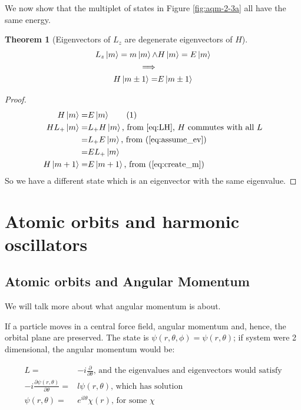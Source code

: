 \documentclass[]{article}
\newcommand\numberthis{\addtocounter{equation}{1}\tag{\theequation}}
\newtheorem{thm}{Theorem}
\begin{document}
 We now show that the multiplet of states in Figure \ref{fig:aqm-2-3a} all have the same energy. 

\begin{thm}[Eigenvectors of $L_z$ are degenerate eigenvectors of $H$]
	\begin{align*}
	L_z \ket{m} = m \ket{m} \land& H \ket{m} = E \ket{m}\\
	 \implies&\\
	  H \ket{m \pm 1} =& E \ket{m \pm 1}
	\end{align*}
\end{thm} 
\begin{proof}
	\begin{align*}
	H \ket{m} =& E \ket{m} \numberthis \label{eq:assume_ev}\\
	H L_+ \ket{m} =& L_+ H \ket{m} \text{, from \eqref{eq:LH}, $H$ commutes with all $L$}\\
	=& L_+ E \ket{m} \text{, from (\ref{eq:assume_ev})}\\
	=& E L_+  \ket{m}\\
	H \ket{m+1} =& E \ket{m+1} \text{, from (\ref{eq:create_m})}
	\end{align*}
	So we have a different state which is an eigenvector with the same eigenvalue.
\end{proof}

\section{Atomic orbits and harmonic oscillators}

\subsection{Atomic orbits and Angular Momentum}

We will talk more about what angular momentum is about.

If a particle moves in a central force field, angular momentum and, hence, the orbital plane are preserved. The state is $\psi(r,\theta,\phi)= \psi(r,\theta)$; if system were 2 dimensional, the angular momentum would be:

\begin{align*}
	L =& -i \frac{\partial}{\partial \theta} \text{, and the eigenvalues and eigenvectors would satisfy}\\
	-i \frac{\partial \psi(r,\theta)}{\partial \theta} =& l \psi(r,\theta) \text{, which has solution}\\
	\psi(r,\theta) =& e^{i l \theta} \chi(r) \text{, for some $\chi$}
\end{align*}
\end{document}
